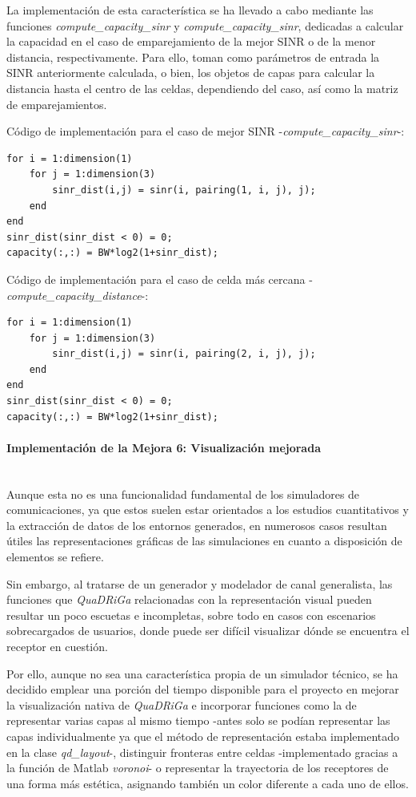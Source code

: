 La implementación de esta característica se ha llevado a cabo mediante las funciones \textit{compute\_capacity\_sinr} y \textit{compute\_capacity\_sinr}, dedicadas a calcular la capacidad en el caso de emparejamiento de la mejor SINR o de la menor distancia, respectivamente. Para ello, toman como parámetros de entrada la SINR anteriormente calculada, o bien, los objetos de capas para calcular la distancia hasta el centro de las celdas, dependiendo del caso, así como la matriz de emparejamientos.

Código de implementación para el caso de mejor SINR -\textit{compute\_capacity\_sinr}-:
\begin{lstlisting}[style=Matlab-editor, basicstyle=\tiny]
for i = 1:dimension(1)
    for j = 1:dimension(3)
        sinr_dist(i,j) = sinr(i, pairing(1, i, j), j);
    end
end
sinr_dist(sinr_dist < 0) = 0;
capacity(:,:) = BW*log2(1+sinr_dist);
\end{lstlisting}

Código de implementación para el caso de celda más cercana -\textit{compute\_capacity\_distance}-:
\begin{lstlisting}[style=Matlab-editor, basicstyle=\tiny]
for i = 1:dimension(1)
    for j = 1:dimension(3)
        sinr_dist(i,j) = sinr(i, pairing(2, i, j), j);
    end
end
sinr_dist(sinr_dist < 0) = 0;
capacity(:,:) = BW*log2(1+sinr_dist);
\end{lstlisting}

\paragraph{Implementación de la Mejora 6: Visualización mejorada} \mbox{} \\

Aunque esta no es una funcionalidad fundamental de los simuladores de comunicaciones, ya que estos suelen estar orientados a los estudios cuantitativos y la extracción de datos de los entornos generados, en numerosos casos resultan útiles las representaciones gráficas de las simulaciones en cuanto a disposición de elementos se refiere.

Sin embargo, al tratarse de un generador y modelador de canal generalista, las funciones que \textit{QuaDRiGa} relacionadas con la representación visual pueden resultar un poco escuetas e incompletas, sobre todo en casos con escenarios sobrecargados de usuarios, donde puede ser difícil visualizar dónde se encuentra el receptor en cuestión.

Por ello, aunque no sea una característica propia de un simulador técnico, se ha decidido emplear una porción del tiempo disponible para el proyecto en mejorar la visualización nativa de \textit{QuaDRiGa} e incorporar funciones como la de representar varias capas al mismo tiempo -antes solo se podían representar las capas individualmente ya que el método de representación estaba implementado en la clase \textit{qd\_layout}-, distinguir fronteras entre celdas -implementado gracias a la función de Matlab \textit{voronoi}- o representar la trayectoria de los receptores de una forma más estética, asignando también un color diferente a cada uno de ellos.

